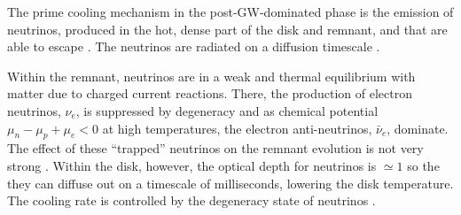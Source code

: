 The prime cooling mechanism in the post-\ac{GW}-dominated phase is the emission of 
neutrinos, produced in the hot, dense part of the disk and remnant, and that are 
able to escape \citep{Eichler:1989ve,Rosswog:2003rv,Sekiguchi:2011zd}. 
The neutrinos are radiated on a diffusion timescale \citep{Perego:2014fma}.

Within the remnant, neutrinos are in a weak and thermal equilibrium with matter 
due to charged current reactions. There, the production of electron neutrinos, $\nu_e$,
is suppressed by degeneracy and as chemical potential $\mu_n-\mu_p+\mu_e<0$ at high temperatures, 
the electron anti-neutrinos, $\bar{\nu}_{e}$, dominate. The effect of these ``trapped'' 
neutrinos on the remnant evolution is not very strong \citep{Foucart:2015gaa,Perego:2019adq}.
%
Within the disk, however, the optical depth for neutrinos is ${\simeq}1$ so 
the they can diffuse out on a timescale of milliseconds, lowering the disk 
temperature. The cooling rate is controlled by the degeneracy state of neutrinos 
\citep{Beloborodov:2008nx}.

